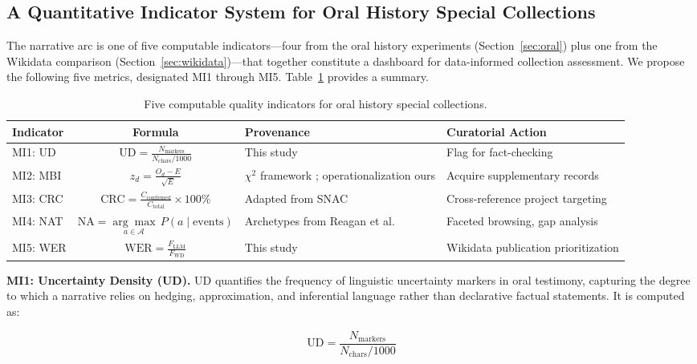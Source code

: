 \documentclass[review]{elsarticle}
\begin{document}
\subsection{A Quantitative Indicator System for Oral History Special Collections}

The narrative arc is one of five computable indicators---four from the oral history experiments (Section~\ref{sec:oral}) plus one from the Wikidata comparison (Section~\ref{sec:wikidata})---that together constitute a dashboard for data-informed collection assessment. We propose the following five metrics, designated MI1 through MI5. Table~\ref{tab:indicators} provides a summary.

\begin{table}[ht]
\centering
\caption{Five computable quality indicators for oral history special collections.}
\label{tab:indicators}
\begin{tabular}{lcll}
\toprule
Indicator & Formula & Provenance & Curatorial Action \\
\midrule
MI1: UD & $\text{UD} = \frac{N_{\text{markers}}}{N_{\text{chars}} / 1000}$ & This study & Flag for fact-checking \\
MI2: MBI & $z_d = \frac{O_d - E}{\sqrt{E}}$ & $\chi^2$ framework \cite{rubin1986autobiographical}; operationalization ours & Acquire supplementary records \\
MI3: CRC & $\text{CRC} = \frac{C_{\text{confirmed}}}{C_{\text{total}}} \times 100\%$ & Adapted from SNAC \cite{larson2015connecting} & Cross-reference project targeting \\
MI4: NAT & $\text{NA} = \underset{a \in \mathcal{A}}{\arg\max}\, P(a \mid \text{events})$  & Archetypes from Reagan et al.\ \cite{reagan2016emotional} & Faceted browsing, gap analysis \\
MI5: WER & $\text{WER} = \frac{F_{\text{LLM}}}{F_{\text{WD}}}$ & This study & Wikidata publication prioritization \\
\bottomrule
\end{tabular}
\end{table}

\textbf{MI1: Uncertainty Density (UD).} UD quantifies the frequency of linguistic uncertainty markers in oral testimony, capturing the degree to which a narrative relies on hedging, approximation, and inferential language rather than declarative factual statements. It is computed as:

\begin{equation}
\text{UD} = \frac{N_{\text{markers}}}{N_{\text{chars}} / 1000}
\end{equation}
\end{document}

